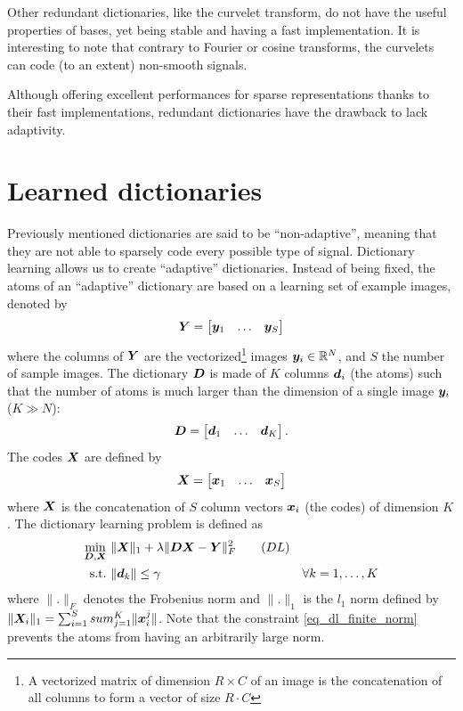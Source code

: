 \noindent
Other redundant dictionaries, like the curvelet transform, do not have the useful properties of bases, yet being stable and having a fast implementation. It is interesting to note that contrary to Fourier or cosine transforms, the curvelets can code (to an extent) non-smooth signals.


\noindent
Although offering excellent performances for sparse representations thanks to their fast implementations, redundant dictionaries have the drawback to lack adaptivity.


\section{Learned dictionaries}
Previously mentioned dictionaries are said to be “non-adaptive”, meaning that they are not able to sparsely code every possible type of signal. Dictionary learning allows us to create “adaptive” dictionaries. Instead of being fixed, the atoms of an “adaptive” dictionary are based on a learning set of example images, denoted by
\begin{equation*}\bm{Y} = \begin{bmatrix} \bm{y}_1 & \dots & \bm{y}_S \end{bmatrix}\end{equation*}
where the columns of $\bm{Y}$ are the vectorized\footnote{A vectorized matrix of dimension $R \times C$ of an image is the concatenation of all columns to form a vector of size $R \cdot C$} images $\bm{y}_i \in \mathbb{R}^N$, and $S$ the number of sample images. The dictionary $\bm{D}$ is made of $K$ columns $\bm{d}_i$ (the atoms) such that the number of atoms is much larger than the dimension of a single image $\bm{y}_i$ ($K \gg N$):
\begin{equation*}\bm{D} = \begin{bmatrix} \bm{d}_1 & \dots & \bm{d}_K \end{bmatrix}.\end{equation*}
The codes $\bm{X}$ are defined by
\begin{equation*}\bm{X} = \begin{bmatrix} \bm{x}_1 & \dots & \bm{x}_{S} \end{bmatrix}\end{equation*}
where $\bm{X}$ is the concatenation of $S$ column vectors $\bm{x}_i$ (the codes) of dimension $K$. The dictionary learning problem is defined as
\begin{align}
\underset{\bm{D},\bm{X}}{\min}~ & \lVert \bm{X} \rVert_1 + \lambda\lVert \bm{D}\bm{X}-\bm{Y} \rVert^2_F \tag{$DL$}\label{eq_dl} \\
\text{s.t.}~ & \lVert \bm{d}_k \rVert \le \gamma & \forall k = 1,\dots,K\label{eq_dl_finite_norm}
\end{align}
where $\lVert . \rVert_F$ denotes the Frobenius norm and $\lVert . \rVert_1$ is the $l_1$ norm defined by $\|\bm{X}_i\|_1  = \sum_{i=1}^S  sum_{j=1}^K \|\bm{x}_i^j \|$.
Note that the constraint \ref{eq_dl_finite_norm} prevents the atoms from having an arbitrarily large norm.

